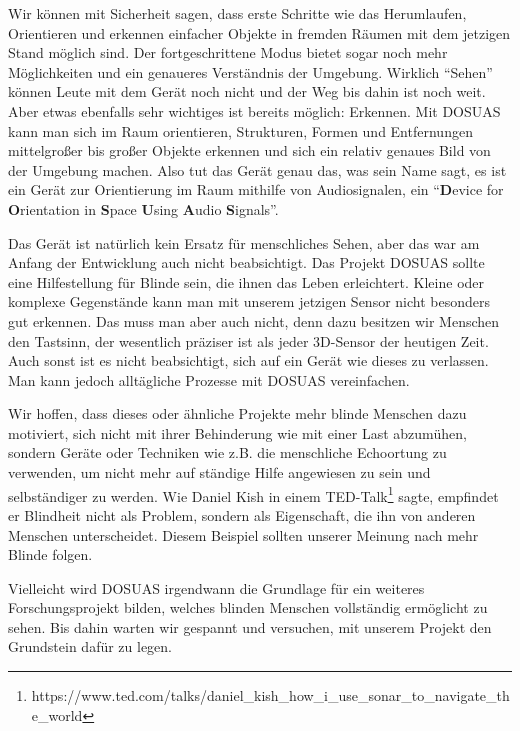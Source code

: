 \documentclass[a4paper,12pt,ngerman]{scrartcl}
\begin{document}
Wir können mit Sicherheit sagen, dass erste Schritte wie das Herumlaufen, Orientieren und erkennen einfacher
Objekte in fremden Räumen mit dem jetzigen Stand möglich sind. Der fortgeschrittene Modus bietet sogar noch mehr 
Möglichkeiten und ein genaueres Verständnis der Umgebung.
Wirklich \enquote{Sehen} können Leute mit dem Gerät noch nicht und der Weg bis dahin ist noch weit.
Aber etwas ebenfalls sehr wichtiges
ist bereits möglich: Erkennen. Mit DOSUAS kann man sich im Raum orientieren, Strukturen, Formen und Entfernungen
mittelgroßer bis großer Objekte erkennen und sich ein relativ genaues Bild von der Umgebung machen. 
Also tut das Gerät genau das, was sein Name sagt, es ist ein Gerät zur Orientierung im Raum mithilfe von Audiosignalen,
ein \enquote{\textbf{D}evice for \textbf{O}rientation in \textbf{S}pace \textbf{U}sing 
\textbf{A}udio \textbf{S}ignals}.\par 
Das Gerät ist natürlich kein Ersatz für menschliches Sehen, aber das war am Anfang der Entwicklung
auch nicht beabsichtigt. Das Projekt DOSUAS sollte eine Hilfestellung für Blinde sein, die ihnen das Leben erleichtert.
Kleine oder komplexe Gegenstände kann man mit unserem jetzigen Sensor nicht besonders gut erkennen. Das muss man aber
auch nicht, denn dazu besitzen wir Menschen den Tastsinn, der wesentlich präziser ist
als jeder 3D-Sensor der heutigen Zeit. Auch sonst ist es nicht beabsichtigt, sich auf 
ein Gerät wie dieses zu verlassen. Man kann jedoch alltägliche Prozesse mit DOSUAS vereinfachen.\par
Wir hoffen, dass dieses oder ähnliche Projekte mehr blinde Menschen dazu motiviert, sich nicht 
mit ihrer Behinderung wie mit einer Last abzumühen, sondern Geräte oder Techniken
wie z.B. die menschliche Echoortung zu verwenden, um nicht mehr auf ständige Hilfe angewiesen 
zu sein und selbständiger zu werden. Wie Daniel Kish in einem TED-Talk\footnote{https://www.ted.com/talks/daniel_kish_how_i_use_sonar_to_navigate_the_world} sagte, 
empfindet er Blindheit nicht als Problem, sondern als Eigenschaft, die ihn von anderen Menschen
unterscheidet. Diesem Beispiel sollten unserer Meinung nach mehr Blinde folgen.\par 
Vielleicht wird DOSUAS irgendwann die Grundlage für ein weiteres
Forschungsprojekt bilden, welches blinden Menschen vollständig ermöglicht zu sehen. Bis dahin
warten wir gespannt und versuchen, mit unserem Projekt den Grundstein dafür zu legen. 

\newpage
\end{document}
